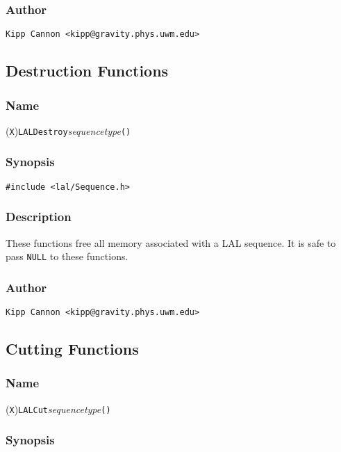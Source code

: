 \subsubsection{Author}

\verb|Kipp Cannon <kipp@gravity.phys.uwm.edu>|


\subsection{Destruction Functions}

\subsubsection{Name}

(\texttt{X})\texttt{LALDestroy}\textit{sequencetype}\texttt{()}

\subsubsection{Synopsis}

\begin{verbatim}
#include <lal/Sequence.h>
\end{verbatim}


\subsubsection{Description}

These functions free all memory associated with a LAL sequence.  It is safe
to pass \texttt{NULL} to these functions.

\subsubsection{Author}

\verb|Kipp Cannon <kipp@gravity.phys.uwm.edu>|


\subsection{Cutting Functions}

\subsubsection{Name}

(\texttt{X})\texttt{LALCut}\textit{sequencetype}\texttt{()}

\subsubsection{Synopsis}

